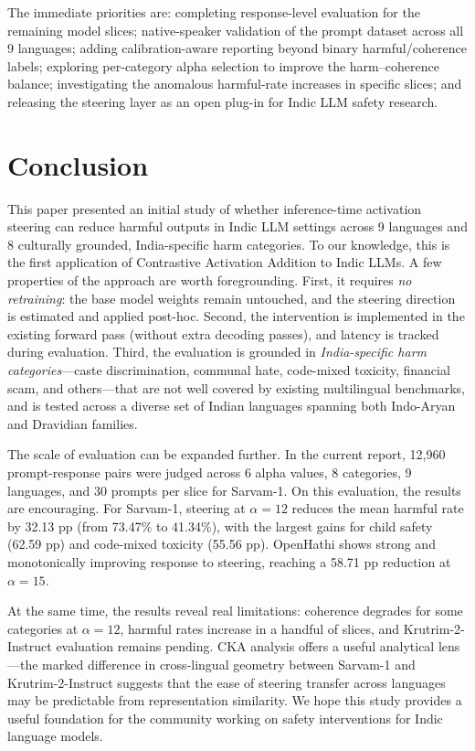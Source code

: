 \documentclass[11pt]{article}
\begin{document}
The immediate priorities are: completing response-level evaluation for the remaining model slices; native-speaker validation of the prompt dataset across all 9 languages; adding calibration-aware reporting beyond binary harmful/coherence labels; exploring per-category alpha selection to improve the harm--coherence balance; investigating the anomalous harmful-rate increases in specific slices; and releasing the steering layer as an open plug-in for Indic LLM safety research.

\section{Conclusion}

This paper presented an initial study of whether inference-time activation steering can reduce harmful outputs in Indic LLM settings across 9 languages and 8 culturally grounded, India-specific harm categories. To our knowledge, this is the first application of Contrastive Activation Addition to Indic LLMs. A few properties of the approach are worth foregrounding. First, it requires \emph{no retraining}: the base model weights remain untouched, and the steering direction is estimated and applied post-hoc. Second, the intervention is implemented in the existing forward pass (without extra decoding passes), and latency is tracked during evaluation. Third, the evaluation is grounded in \emph{India-specific harm categories}---caste discrimination, communal hate, code-mixed toxicity, financial scam, and others---that are not well covered by existing multilingual benchmarks, and is tested across a diverse set of Indian languages spanning both Indo-Aryan and Dravidian families.

The scale of evaluation can be expanded further. In the current report, 12,960 prompt-response pairs were judged across 6 alpha values, 8 categories, 9 languages, and 30 prompts per slice for Sarvam-1. On this evaluation, the results are encouraging. For Sarvam-1, steering at $\alpha=12$ reduces the mean harmful rate by 32.13 pp (from 73.47\% to 41.34\%), with the largest gains for child safety (62.59 pp) and code-mixed toxicity (55.56 pp). OpenHathi shows strong and monotonically improving response to steering, reaching a 58.71 pp reduction at $\alpha=15$.

At the same time, the results reveal real limitations: coherence degrades for some categories at $\alpha=12$, harmful rates increase in a handful of slices, and Krutrim-2-Instruct evaluation remains pending. CKA analysis offers a useful analytical lens---the marked difference in cross-lingual geometry between Sarvam-1 and Krutrim-2-Instruct suggests that the ease of steering transfer across languages may be predictable from representation similarity. We hope this study provides a useful foundation for the community working on safety interventions for Indic language models.
\end{document}
